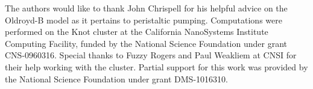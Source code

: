 The authors would like to thank John Chrispell for his helpful advice on the Oldroyd-B model as it pertains to peristaltic pumping. Computations were performed on the Knot cluster at the California NanoSystems Institute Computing Facility, funded by the National Science Foundation under grant CNS-0960316. Special thanks to Fuzzy Rogers and Paul Weakliem at CNSI for their help working with the cluster. Partial support for this work was provided by the National Science Foundation under grant DMS-1016310. 

